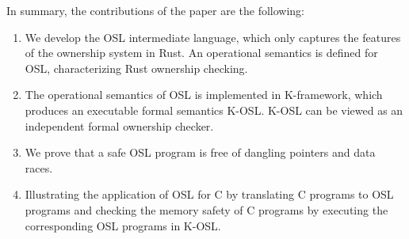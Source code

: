 \documentclass[runningheads]{llncs}
\begin{document}
%
%
%
%
%

In summary, the contributions of the paper are the following: 
\begin{enumerate}
	\item We develop the OSL intermediate language, which only captures the features of the ownership system in Rust.
	An operational semantics is defined for OSL, characterizing Rust ownership checking.
	\item The  operational semantics of OSL is implemented in K-framework, which produces an executable formal semantics K-OSL. K-OSL can be viewed as an independent formal ownership checker.
    \item We prove that a safe OSL program is free of dangling pointers and data races.
   \item Illustrating the application of OSL for C by translating C programs to OSL programs and checking the memory safety of C programs by executing the corresponding OSL programs in K-OSL. 
\end{enumerate} 
\end{document}
